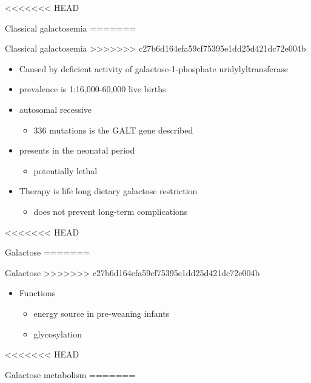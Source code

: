 \documentclass[presentation, smaller]{beamer}
\begin{document}
<<<<<<< HEAD
\begin{frame}[label={sec:orgheadline1}]{Classical galactosemia}
=======
\begin{frame}[label={sec:orga03d061}]{Classical galactosemia}
>>>>>>> c27b6d164efa59cf75395e1dd25d421dc72e004b
\begin{itemize}
\item Caused by deficient activity of galactose-1-phosphate uridylyltransferase
\item prevalence is 1:16,000-60,000 live births
\item autosomal recessive
\begin{itemize}
\item 336 mutations is the GALT gene described
\end{itemize}

\item presents in the neonatal period
\begin{itemize}
\item potentially lethal
\end{itemize}

\item Therapy is life long dietary galactose restriction
\begin{itemize}
\item does not prevent long-term complications
\end{itemize}
\end{itemize}
\end{frame}

<<<<<<< HEAD
\begin{frame}[label={sec:orgheadline2}]{Galactose}
=======
\begin{frame}[label={sec:orgd1f45fb}]{Galactose}
>>>>>>> c27b6d164efa59cf75395e1dd25d421dc72e004b
\begin{itemize}
\item Functions
\begin{itemize}
\item energy source in pre-weaning infants
\item glycosylation
\end{itemize}
\end{itemize}
\end{frame}

<<<<<<< HEAD
\begin{frame}[label={sec:orgheadline3}]{Galactose metabolism}
=======


\end{frame}
\end{frame}
\end{frame}
\end{document}
